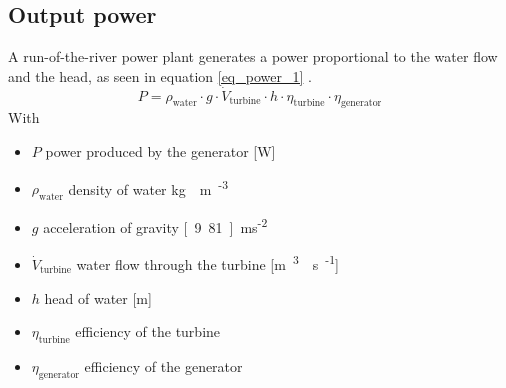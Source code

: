 \subsection{Output power}
A run-of-the-river power plant generates a power proportional to the water flow and the head, as seen in equation \ref{eq_power_1} \cite{quaschning}.
\begin{equation}
\label{eq_power_1} 
 P = \rho_\mathrm{water} \cdot g \cdot \dot{V}_\mathrm{turbine} \cdot h \cdot \eta_\mathrm{turbine} \cdot \eta_\mathrm{generator}
\end{equation}
With 
\begin{itemize}
\itemsep0em 
 \item $P$ \tabto{4cm} power produced by the generator \tabto{12cm} [\unit{W}]
 \item $\rho_\mathrm{water}$ \tabto{4cm} density of water \tabto{12cm} \unit[1000]{kg\textperiodcentered m\textsuperscript{-3}}
 \item $g$ \tabto{4cm} acceleration of gravity \tabto{12cm} \unit[9.81]{m\textperiodcentered s\textsuperscript{-2}}
 \item $\dot{V}_\mathrm{turbine}$ \tabto{4cm} water flow through the turbine \tabto{12cm} [\unit{m\textsuperscript{3}\textperiodcentered s\textsuperscript{-1}}]
 \item $h$ \tabto{4cm} head of water \tabto{12cm} [\unit{m}]
 \item $\eta_\mathrm{turbine}$ \tabto{4cm} efficiency of the turbine
 \item $\eta_\mathrm{generator}$ \tabto{4cm} efficiency of the generator
\end{itemize}


